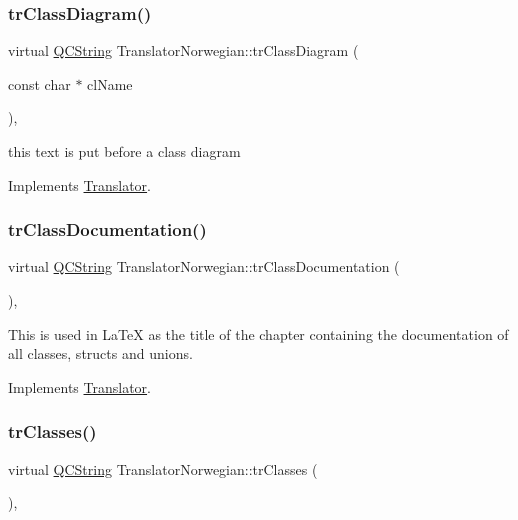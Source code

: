 \subsubsection{\texorpdfstring{trClassDiagram()}{trClassDiagram()}}
{\footnotesize\ttfamily virtual \mbox{\hyperlink{class_q_c_string}{Q\+C\+String}} Translator\+Norwegian\+::tr\+Class\+Diagram (\begin{DoxyParamCaption}\item[{const char $\ast$}]{cl\+Name }\end{DoxyParamCaption})\hspace{0.3cm}{\ttfamily [inline]}, {\ttfamily [virtual]}}

this text is put before a class diagram 

Implements \mbox{\hyperlink{class_translator}{Translator}}.

\mbox{\label{class_translator_norwegian_aae6f1f2f29b67ff9410077edbc6910fd}} 
\subsubsection{\texorpdfstring{trClassDocumentation()}{trClassDocumentation()}}
{\footnotesize\ttfamily virtual \mbox{\hyperlink{class_q_c_string}{Q\+C\+String}} Translator\+Norwegian\+::tr\+Class\+Documentation (\begin{DoxyParamCaption}{ }\end{DoxyParamCaption})\hspace{0.3cm}{\ttfamily [inline]}, {\ttfamily [virtual]}}

This is used in La\+TeX as the title of the chapter containing the documentation of all classes, structs and unions. 

Implements \mbox{\hyperlink{class_translator}{Translator}}.

\mbox{\label{class_translator_norwegian_a6f5a448e25b026e9857c36c849d56451}} 
\subsubsection{\texorpdfstring{trClasses()}{trClasses()}}
{\footnotesize\ttfamily virtual \mbox{\hyperlink{class_q_c_string}{Q\+C\+String}} Translator\+Norwegian\+::tr\+Classes (\begin{DoxyParamCaption}{ }\end{DoxyParamCaption})\hspace{0.3cm}{\ttfamily [inline]}, {\ttfamily [virtual]}}


